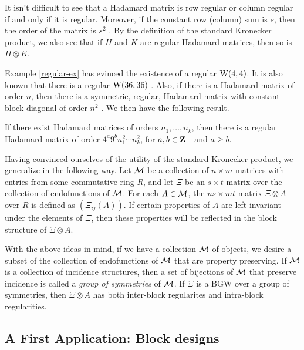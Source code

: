 \documentclass[../../../main]{subfiles}
\begin{document}
 It isn't difficult to see that a Hadamard matrix is row regular or column regular if and only if it is regular. Moreover, if the constant row (column) sum is $s$, then the order of the matrix is $s^2$ \cite[see][Chapter 4]{combinatorial-designs}. By the definition of the standard Kronecker product, we also see that if $H$ and $K$ are regular Hadamard matrices, then so is $H \otimes K$.
 
 Example \ref{regular-ex} has evinced the existence of a regular $\text{W}(4,4)$. It is also known that there is a regular $\text{W}(36,36)$ \cite[see][Chapter 4]{combinatorial-designs}. Also, if there is a Hadamard matrix of order $n$, then there is a symmetric, regular, Hadamard matrix with constant block diagonal of order $n^2$ \cite[see][Part V]{handbook}. We then have the following result.
 
 \begin{prop}
  If there exist Hadamard matrices of orders $n_1, \dots, n_k$, then there is a regular Hadamard matrix of order $4^a9^bn_1^2\cdots n_k^2$, for $a,b \in \mathbf{Z}_+$ and $a \geq b$.
 \end{prop}
 
 Having convinced ourselves of the utility of the standard Kronecker product, we generalize in the following way. Let $\mathcal{M}$ be a collection of $n \times m$ matrices with entries from some commutative ring $R$, and let $\Xi$ be an $s \times t$ matrix over the collection of endofunctions of $\mathcal{M}$. For each $A \in \mathcal{M}$, the $ns \times mt$ matrix $\Xi \otimes A$ over $R$ is defined as $(\Xi_{ij}(A))$. If certain properties of $A$ are left invariant under the elements of $\Xi$, then these properties will be reflected in the block structure of $\Xi \otimes A$.
 
 With the above ideas in mind, if we have a collection $\mathcal{M}$ of objects, we desire a subset of the collection of endofunctions of $\mathcal{M}$ that are property preserving. If $\mathcal{M}$ is a collection of incidence structures, then a set of bijections of $\mathcal{M}$ that preserve incidence is called a {\it group of symmetries} of $\mathcal{M}$. If $\Xi$ is a BGW over a group of symmetries, then $\Xi \otimes A$ has both inter-block regularites and intra-block regularities.
 
 \dinkus
 
\subsection{A First Application: Block designs}
\end{document}

